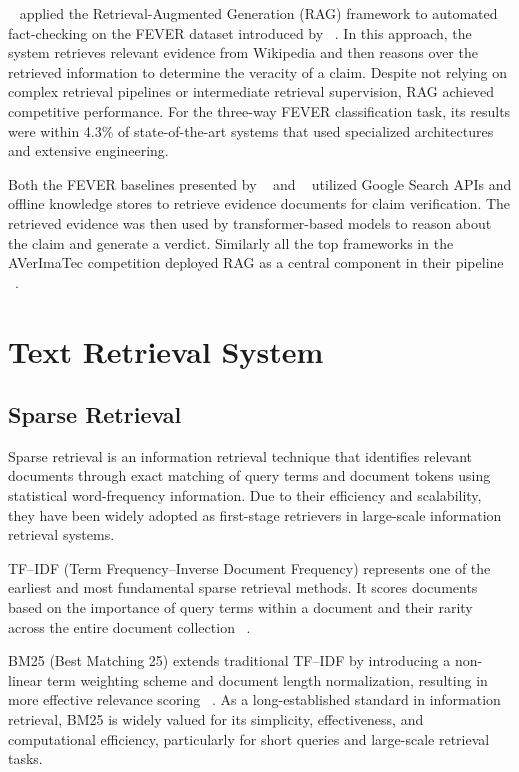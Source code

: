~\citet{Lewis2020May} applied the Retrieval-Augmented Generation (RAG) framework to automated fact-checking on the FEVER dataset introduced by ~\citet{Thorne2018Jun}. In this approach, the system retrieves relevant evidence from Wikipedia and then reasons over the retrieved information to determine the veracity of a claim. Despite not relying on complex retrieval pipelines or intermediate retrieval supervision, RAG achieved competitive performance. For the three-way FEVER classification task, its results were within 4.3\% of state-of-the-art systems that used specialized architectures and extensive engineering.

Both the FEVER baselines presented by ~\citet{Schlichtkrull2023May} and ~\citet{Schlichtkrull2024Nov} utilized Google Search APIs and offline knowledge stores to retrieve evidence documents for claim verification. The retrieved evidence was then used by transformer-based models to reason about the claim and generate a verdict. Similarly all the top frameworks in the AVerImaTec competition deployed RAG as a central component in their pipeline ~\cite{Cao2026Mar}.

\section{Text Retrieval System}

\subsection{Sparse Retrieval}

Sparse retrieval is an information retrieval technique that identifies relevant documents through exact matching of query terms and document tokens using statistical word-frequency information. Due to their efficiency and scalability, they have been widely adopted as first-stage retrievers in large-scale information retrieval systems.

TF–IDF (Term Frequency–Inverse Document Frequency) represents one of the earliest and most fundamental sparse retrieval methods. It scores documents based on the importance of query terms within a document and their rarity across the entire document collection ~\cite{Wang2024Jul}.

BM25 (Best Matching 25) extends traditional TF–IDF by introducing a non-linear term weighting scheme and document length normalization, resulting in more effective relevance scoring ~\cite{Robertson2009Sep}. As a long-established standard in information retrieval, BM25 is widely valued for its simplicity, effectiveness, and computational efficiency, particularly for short queries and large-scale retrieval tasks.

